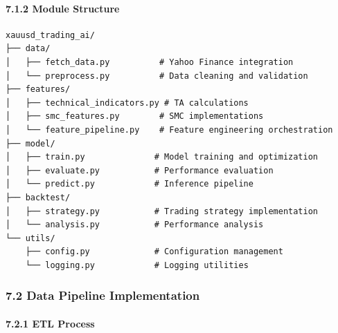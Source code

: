 \paragraph{7.1.2 Module Structure}\label{module-structure}

\begin{verbatim}
xauusd_trading_ai/
├── data/
│   ├── fetch_data.py          # Yahoo Finance integration
│   └── preprocess.py          # Data cleaning and validation
├── features/
│   ├── technical_indicators.py # TA calculations
│   ├── smc_features.py        # SMC implementations
│   └── feature_pipeline.py    # Feature engineering orchestration
├── model/
│   ├── train.py              # Model training and optimization
│   ├── evaluate.py           # Performance evaluation
│   └── predict.py            # Inference pipeline
├── backtest/
│   ├── strategy.py           # Trading strategy implementation
│   └── analysis.py           # Performance analysis
└── utils/
    ├── config.py             # Configuration management
    └── logging.py            # Logging utilities
\end{verbatim}

\subsubsection{7.2 Data Pipeline
Implementation}\label{data-pipeline-implementation}

\paragraph{7.2.1 ETL Process}\label{etl-process}

\begin{Shaded}
\begin{Highlighting}[]
\OperatorTok{=}\NormalTok{, }\NormalTok{, }\NormalTok{)}

\OperatorTok{=}
\OperatorTok{=}

\OperatorTok{=}\NormalTok{)}
\end{Highlighting}
\end{Shaded}


